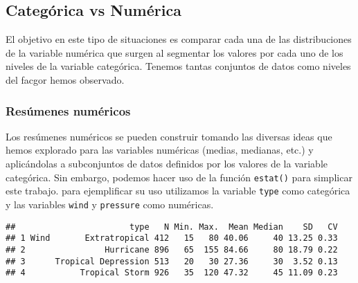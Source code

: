 \documentclass[
]{book}
\newenvironment{Shaded}{\begin{snugshade}}{\end{snugshade}}
\newcommand{\AttributeTok}[1]{\textcolor[rgb]{0.77,0.63,0.00}{#1}}
\newcommand{\CommentTok}[1]{\textcolor[rgb]{0.56,0.35,0.01}{\textit{#1}}}
\newcommand{\FunctionTok}[1]{\textcolor[rgb]{0.00,0.00,0.00}{#1}}
\newcommand{\NormalTok}[1]{#1}
\newcommand{\OtherTok}[1]{\textcolor[rgb]{0.56,0.35,0.01}{#1}}
\newcommand{\SpecialCharTok}[1]{\textcolor[rgb]{0.00,0.00,0.00}{#1}}
\newcommand{\StringTok}[1]{\textcolor[rgb]{0.31,0.60,0.02}{#1}}
\begin{document}
\hypertarget{categuxf3rica-vs-numuxe9rica}{%
\subsection{Categórica vs Numérica}\label{categuxf3rica-vs-numuxe9rica}}

El objetivo en este tipo de situaciones es comparar cada una de las distribuciones de la variable numérica que surgen al segmentar los valores por cada uno de los niveles de la variable categórica. Tenemos tantas conjuntos de datos como niveles del facgor hemos observado.

\hypertarget{resuxfamenes-numuxe9ricos-3}{%
\subsubsection{Resúmenes numéricos}\label{resuxfamenes-numuxe9ricos-3}}

Los resúmenes numéricos se pueden construir tomando las diversas ideas que hemos explorado para las variables numéricas (medias, medianas, etc.) y aplicándolas a subconjuntos de datos definidos por los valores de la variable categórica. Sin embargo, podemos hacer uso de la función \texttt{estat()} para simplicar este trabajo. para ejemplificar su uso utilizamos la variable \texttt{type} como categórica y las variables \texttt{wind} y \texttt{pressure} como numéricas.

\begin{Shaded}
\end{Shaded}

\begin{verbatim}
##                       type   N Min. Max.  Mean Median    SD   CV
## 1 Wind       Extratropical 412   15   80 40.06     40 13.25 0.33
## 2                Hurricane 896   65  155 84.66     80 18.79 0.22
## 3      Tropical Depression 513   20   30 27.36     30  3.52 0.13
## 4           Tropical Storm 926   35  120 47.32     45 11.09 0.23
\end{verbatim}
\end{document}
